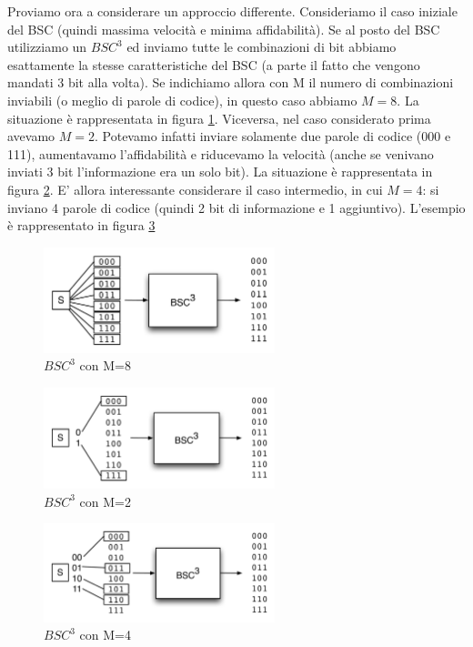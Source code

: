 Proviamo ora a considerare un approccio differente. Consideriamo il caso iniziale del BSC (quindi massima velocità e minima affidabilità). Se al posto del BSC utilizziamo un $BSC^3$ ed inviamo tutte le combinazioni di bit abbiamo esattamente la stesse caratteristiche del BSC (a parte il fatto che vengono mandati 3 bit alla volta). Se indichiamo allora con M il numero di combinazioni 
inviabili (o meglio di parole di codice), in questo caso abbiamo $M=8$.
La situazione è rappresentata in figura \ref{fig:mbsc1}.
Viceversa, nel caso considerato prima avevamo $M=2$. Potevamo infatti inviare solamente due parole di codice (000 e 111), aumentavamo 
l'affidabilità e riducevamo la velocità (anche se venivano inviati 3 bit l'informazione era un solo bit). 
La situazione è rappresentata in figura \ref{fig:mbsc2}.
E' allora interessante considerare il caso intermedio, in cui $M=4$: si inviano 4 parole di codice (quindi 2 bit di informazione e 1 aggiuntivo).
L'esempio è rappresentato in figura \ref{fig:mbsc3}


\begin{figure}[htbp]
\begin{center}
	\includegraphics[width=0.6\textwidth]{img/mbsc1.pdf}
\caption{$BSC^3$ con M=8}
\label{fig:mbsc1}
\end{center}
\end{figure}

\begin{figure}[htbp]
\begin{center}
	\includegraphics[width=0.6\textwidth]{img/mbsc2.pdf}
\caption{$BSC^3$ con M=2}
\label{fig:mbsc2}
\end{center}
\end{figure}

\begin{figure}[htbp]
\begin{center}
	\includegraphics[width=0.6\textwidth]{img/mbsc3.pdf}
\caption{$BSC^3$ con M=4}
\label{fig:mbsc3}
\end{center}
\end{figure}

